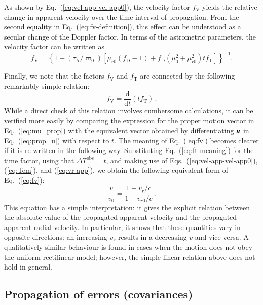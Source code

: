 \documentclass{aa}
\def\vec#1{\ensuremath{\mathchoice{\mbox{\boldmath$\displaystyle#1$}}
{\mbox{\boldmath$\textstyle#1$}}
{\mbox{\boldmath$\scriptstyle#1$}}
{\mbox{\boldmath$\scriptscriptstyle#1$}}}}
\begin{document}
As shown by Eq.~(\ref{eq:vel-app-vel-app0}), the velocity factor
$f_\mathrm{V}$ yields the relative change in apparent velocity
over the time interval of propagation. From the second equality in
Eq.~(\ref{eq:fv-definition}), this effect can be
understood as a secular change of the Doppler factor. In terms of
the astrometric parameters, the velocity factor can be written as
\begin{equation}
    f_\mathrm{V}=
    \left\{1+\left(\tau_\mathrm{A}/\varpi_0\right)
    \left[\mu_{r0}\left(f_\mathrm{D}-1\right)+f_\mathrm{D}\left(\mu_0^2+\mu_{r0}^2\right)tf_\mathrm{T}
    \right]
    \right\}^{-1}.
\end{equation}

Finally, we note that the factors $f_\mathrm{V}$ and $f_\mathrm{T}$ are
connected by the following remarkably simple relation:
\begin{equation}\label{eq:fv}
    f_\mathrm{V}=
    \frac{\mathrm{d}}{\mathrm{d}t}\left(tf_\mathrm{T}\right)\,.
\end{equation}
While a direct check of this relation involves cumbersome calculations,
it can be verified more easily by comparing the expression for the proper motion
vector in Eq.~(\ref{eq:mu_prop}) with the equivalent vector obtained by
differentiating $\vec{u}$ in Eq.~(\ref{eq:prop_u}) with respect to $t$.
The meaning of Eq.~(\ref{eq:fv}) becomes clearer if it is re-written in the
following way. Substituting Eq.~(\ref{eq:ft-meaning}) for the time factor,
using that $\Delta T^\mathrm{obs}=t$, and making use of
Eqs.~(\ref{eq:vel-app-vel-app0}), (\ref{eq:Tem}), and (\ref{eq:vr-app}),
we obtain the following equivalent form of Eq.~(\ref{eq:fv}):
\begin{equation}
    \frac{v}{v_0}=
    \frac{1-v_{r}/c}{1-v_{r0}/c}\,.
\end{equation}
This equation has a simple interpretation: it gives the explicit relation between the absolute value of the propagated apparent velocity and the propagated
apparent radial velocity. In particular, it shows that these quantities vary in opposite directions: an increasing $v_{r}$ results in a decreasing $v$ and vice versa.
A qualitatively similar behaviour is found in cases when the motion does not
obey the uniform rectilinear model; however, the simple linear relation above does not hold in general.

\subsection{Propagation of errors (covariances)}
\label{sec:propCov}
\end{document}
